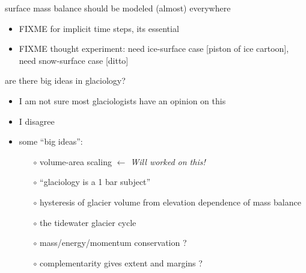 \documentclass[10pt,hyperref,dvipsnames]{beamer}
\begin{document}
\begin{frame}{surface mass balance should be modeled (almost) everywhere}
\begin{itemize}
\item FIXME for implicit time steps, its essential
\item FIXME thought experiment: need ice-surface case [piston of ice cartoon], need snow-surface case [ditto]
\end{itemize}
\end{frame}


\begin{frame}{are there big ideas in glaciology?}
\begin{itemize}
\item I am not sure most glaciologists have an opinion on this
\item I disagree

\bigskip
\item<2-3> some ``big ideas'':
    \begin{itemize}
    \item[$\circ$] volume-area scaling \quad \emph{$\longleftarrow$ Will worked on this!}
    \item[$\circ$] ``glaciology is a 1 bar subject''
    \item[$\circ$] hysteresis of glacier volume from elevation dependence of mass balance
    \item[$\circ$] the tidewater glacier cycle
    \item[$\circ$] mass/energy/momentum conservation \quad ?
    \item[$\circ$] complementarity gives extent and margins \quad ?
    \end{itemize}
\end{itemize}
\end{frame}
\end{document}
